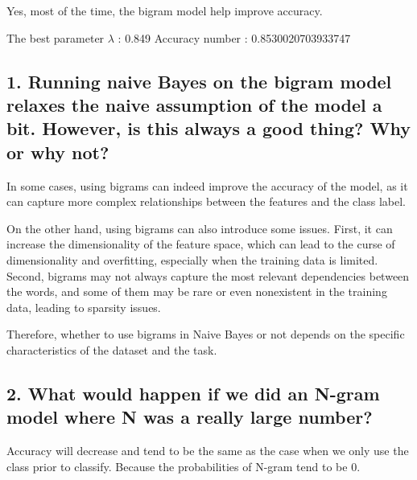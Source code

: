 Yes, most of the time, the bigram model help improve accuracy.

The best parameter $\lambda$ : 0.849
Accuracy number : 0.8530020703933747

\subsection*{1. Running naive Bayes on the bigram model relaxes the naive assumption of the model a bit. However, is this always a good thing? Why or why not?}

In some cases, using bigrams can indeed improve the accuracy of the model, as it can capture more complex relationships between the features and the class label. 

On the other hand, using bigrams can also introduce some issues. First, it can increase the dimensionality of the feature space, which can lead to the curse of dimensionality and overfitting, especially when the training data is limited. Second, bigrams may not always capture the most relevant dependencies between the words, and some of them may be rare or even nonexistent in the training data, leading to sparsity issues.

Therefore, whether to use bigrams in Naive Bayes or not depends on the specific characteristics of the dataset and the task. 

\subsection*{2. What would happen if we did an N-gram model where N was a really large number?}

Accuracy will decrease and tend to be the same as the case when we only use the class prior to classify. Because the probabilities of N-gram tend to be 0.